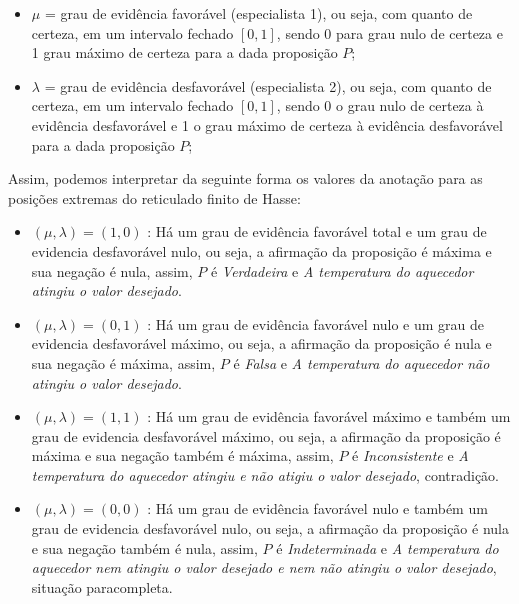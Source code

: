 \begin{itemize}
\item 
$\mu$ = grau de evidência favorável (especialista 1), ou seja, com quanto de certeza, em um intervalo fechado $[0,1]$, sendo 0 para grau nulo de certeza e 1 grau máximo de certeza para a dada proposição $P$;

\item
$\lambda$ = grau de evidência desfavorável (especialista 2), ou seja, com quanto de certeza, em um intervalo fechado $[0,1]$, sendo 0 o grau nulo de certeza à evidência desfavorável e 1 o grau máximo de certeza à evidência desfavorável para a dada proposição $P$;

\end{itemize}


Assim, podemos interpretar da seguinte forma os valores da anotação para as posições extremas do reticulado finito de Hasse:

\begin{itemize}
\item 
$(\mu, \lambda ) = (1,0)$ : Há um grau de evidência favorável total e um grau de evidencia desfavorável nulo, ou seja, a afirmação da proposição é máxima e sua negação é nula, assim,  $P$ é \emph{Verdadeira} e \emph{A temperatura do aquecedor atingiu o valor desejado}.

\item 
$(\mu, \lambda ) = (0,1)$ : Há um grau de evidência favorável nulo e um grau de evidencia desfavorável máximo, ou seja, a afirmação da proposição é nula e sua negação é máxima, assim,  $P$ é \emph{Falsa} e \emph{A temperatura do aquecedor não atingiu o valor desejado}.

\item 
$(\mu, \lambda ) = (1,1)$ : Há um grau de evidência favorável máximo e também um grau de evidencia desfavorável máximo, ou seja, a afirmação da proposição é máxima e sua negação também é máxima, assim,  $P$ é \emph{Inconsistente} e \emph{A temperatura do aquecedor atingiu e não atigiu o valor desejado}, contradição.

\item 
$(\mu, \lambda ) = (0,0)$ : Há um grau de evidência favorável nulo e também um grau de evidencia desfavorável nulo, ou seja, a afirmação da proposição é nula e sua negação também é nula, assim,  $P$ é \emph{Indeterminada} e \emph{A temperatura do aquecedor nem atingiu o valor desejado e nem não atingiu o valor desejado}, situação paracompleta.

\end{itemize}


